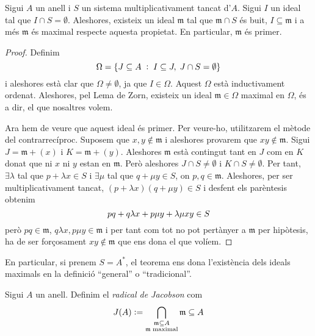 \documentclass[../../../main.tex]{subfiles}
\begin{document}
\begin{ter}
\label{ter:sistemamultiplicativamenttancat} Sigui $A$ un anell i $S$ un sistema multiplicativament tancat d'$A$. Sigui $I$ un ideal tal que $I\cap S = \emptyset$. Aleshores, existeix un ideal $\mathfrak{m}$ tal que $\mathfrak{m}\cap S$ és buit, $I\subseteq\mathfrak{m}$ i a més $\mathfrak{m}$ és maximal respecte aquesta propietat. En particular, $\mathfrak{m}$ és primer.
\end{ter}
\begin{proof}
Definim
\begin{equation}
    \notag
    \Omega = \{J\subseteq A\;:\;I\subseteq J,\;J\cap S = \emptyset\}
\end{equation}
i aleshores està clar que $\Omega\not=\emptyset$, ja que $I\in\Omega$. Aquest $\Omega$ està inductivament ordenat. Aleshores, pel Lema de Zorn, existeix un ideal $\mathfrak{m}\in\Omega$ maximal en $\Omega$, és a dir, el que nosaltres volem.

Ara hem de veure que aquest ideal és primer. Per veure-ho, utilitzarem el mètode del contrarrecíproc. Suposem que $x,y\not\in\mathfrak{m}$ i aleshores provarem que $xy\not\in\mathfrak{m}$. Sigui $J = \mathfrak{m}+(x)$ i $K = \mathfrak{m}+(y)$. Aleshores $\mathfrak{m}$ està contingut tant en $J$ com en $K$ donat que ni $x$ ni $y$ estan en $\mathfrak{m}$. Però aleshores $J\cap S\not=\emptyset$ i $K\cap S\not=\emptyset$. Per tant, $\exists \lambda$ tal que $p+\lambda x\in S$ i $\exists\mu$ tal que $q+\mu y\in S$, on $p,q\in\mathfrak{m}$. Aleshores, per ser multiplicativament tancat, $(p+\lambda x)(q+\mu y)\in S$ i desfent els parèntesis obtenim
\begin{equation}
    \notag
    pq+q\lambda x+p\mu y+\lambda\mu xy\in S
\end{equation}
però $pq\in\mathfrak{m}$, $q\lambda x,p\mu y\in\mathfrak{m}$ i per tant com tot no pot pertànyer a $\mathfrak{m}$ per hipòtesis, ha de ser forçosament $xy\not\in \mathfrak{m}$ que ens dona el que volíem.
\end{proof}

En particular, si prenem $S = A^*$, el teorema ens dona l'existència dels ideals maximals en la definició ``general'' o ``tradicional''.

\begin{defi}
\label{def:radicaldejacobson} Sigui $A$ un anell. Definim el \textit{radical de Jacobson} com
\begin{equation}
    \notag
    J(A):=\bigcap_{\substack{\mathfrak{m}\subseteq A\\\mathfrak{m}\;\text{maximal}}} \mathfrak{m}\subseteq A
\end{equation}
\end{defi}
\end{document}
